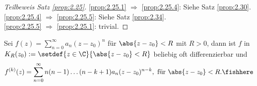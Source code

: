 \begin{proof}[Teilbeweis Satz \ref{prop:2.25}]
\ref{prop:2.25.1} $\Rightarrow$ \ref{prop:2.25.4}: Siehe Satz \ref{prop:2.30}.\\
\ref{prop:2.25.4} $\Rightarrow$ \ref{prop:2.25.5}: Siehe Satz \ref{prop:2.34}.\\
\ref{prop:2.25.5} $\Rightarrow$ \ref{prop:2.25.1}: trivial.\qedhere
\end{proof}

\begin{prop}
\label{prop:2.34} Sei $f(z) = \sum\limits_{n=0}^\infty a_n(z-z_0)^n$ für
$\abs{z-z_0} < R$ mit $R> 0$, dann ist $f$ in $K_R(z_0) :=
\setdef{z\in\C}{\abs{z-z_0}<R}$ beliebig oft differenzierbar und 
\begin{align*}
f^{(k)}(z) = \sum\limits_{n=0}^\infty n(n-1)\ldots(n-k+1) a_n(z-z_0)^{n-k},
\text{ für } \abs{z-z_0}<R.\fishhere
\end{align*}
\end{prop}
